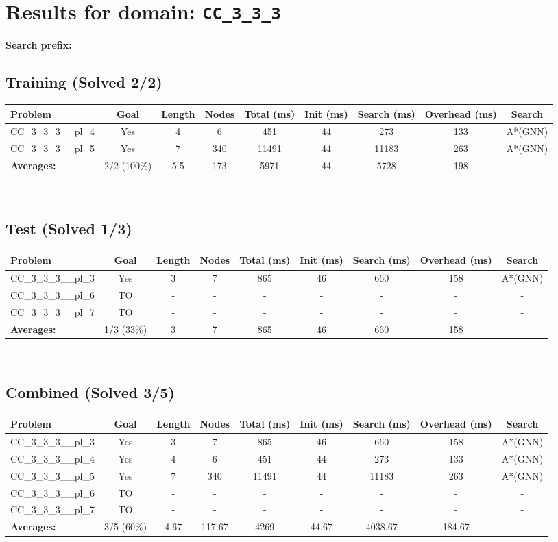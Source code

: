 \documentclass{article}
\begin{document}
\section*{Results for domain: \texttt{CC\_3\_3\_3}}
\textbf{Search prefix:} 
\\[0.5cm]
\subsection*{Training (Solved 2/2)}
\begin{tabular}{lcccccccc}
\toprule
Problem & Goal & Length & Nodes & Total (ms) & Init (ms) & Search (ms) & Overhead (ms) & Search \\
\midrule
CC\_3\_3\_3\_\_pl\_4 & Yes & 4 & 6 & 451 & 44 & 273 & 133 & A*(GNN) \\
CC\_3\_3\_3\_\_pl\_5 & Yes & 7 & 340 & 11491 & 44 & 11183 & 263 & A*(GNN) \\
\textbf{Averages:} & 2/2 (100\%) & 5.5 & 173 & 5971 & 44 & 5728 & 198 & \\
\bottomrule
\end{tabular}
\\[0.7cm]
\subsection*{Test (Solved 1/3)}
\begin{tabular}{lcccccccc}
\toprule
Problem & Goal & Length & Nodes & Total (ms) & Init (ms) & Search (ms) & Overhead (ms) & Search \\
\midrule
CC\_3\_3\_3\_\_pl\_3 & Yes & 3 & 7 & 865 & 46 & 660 & 158 & A*(GNN) \\
CC\_3\_3\_3\_\_pl\_6 & TO & - & - & - & - & - & - & - \\
CC\_3\_3\_3\_\_pl\_7 & TO & - & - & - & - & - & - & - \\
\textbf{Averages:} & 1/3 (33\%) & 3 & 7 & 865 & 46 & 660 & 158 & \\
\bottomrule
\end{tabular}
\\[0.7cm]
\subsection*{Combined (Solved 3/5)}
\begin{tabular}{lcccccccc}
\toprule
Problem & Goal & Length & Nodes & Total (ms) & Init (ms) & Search (ms) & Overhead (ms) & Search \\
\midrule
CC\_3\_3\_3\_\_pl\_3 & Yes & 3 & 7 & 865 & 46 & 660 & 158 & A*(GNN) \\
CC\_3\_3\_3\_\_pl\_4 & Yes & 4 & 6 & 451 & 44 & 273 & 133 & A*(GNN) \\
CC\_3\_3\_3\_\_pl\_5 & Yes & 7 & 340 & 11491 & 44 & 11183 & 263 & A*(GNN) \\
CC\_3\_3\_3\_\_pl\_6 & TO & - & - & - & - & - & - & - \\
CC\_3\_3\_3\_\_pl\_7 & TO & - & - & - & - & - & - & - \\
\textbf{Averages:} & 3/5 (60\%) & 4.67 & 117.67 & 4269 & 44.67 & 4038.67 & 184.67 & \\
\bottomrule
\end{tabular}
\\[0.7cm]
\end{document}
